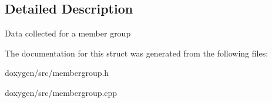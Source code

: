 \subsection{Detailed Description}
Data collected for a member group 

The documentation for this struct was generated from the following files\+:\begin{DoxyCompactItemize}
\item 
doxygen/src/membergroup.\+h\item 
doxygen/src/membergroup.\+cpp\end{DoxyCompactItemize}
